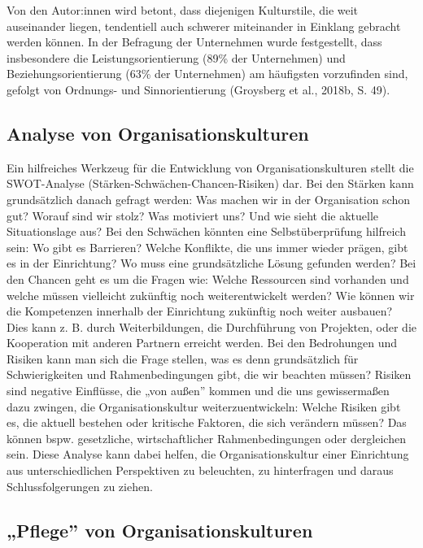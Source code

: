 \documentclass[
  letterpaper,
]{book}
\begin{document}
Von den Autor:innen wird betont, dass diejenigen Kulturstile, die weit
auseinander liegen, tendentiell auch schwerer miteinander in Einklang
gebracht werden können. In der Befragung der Unternehmen wurde
festgestellt, dass insbesondere die Leistungsorientierung (89\% der
Unternehmen) und Beziehungsorientierung (63\% der Unternehmen) am
häufigsten vorzufinden sind, gefolgt von Ordnungs- und Sinnorientierung
(Groysberg et al., 2018b, S. 49).

\subsection{Analyse von
Organisationskulturen}\label{analyse-von-organisationskulturen}

Ein hilfreiches Werkzeug für die Entwicklung von Organisationskulturen
stellt die SWOT-Analyse (Stärken-Schwächen-Chancen-Risiken) dar. Bei den
Stärken kann grundsätzlich danach gefragt werden: Was machen wir in der
Organisation schon gut? Worauf sind wir stolz? Was motiviert uns? Und
wie sieht die aktuelle Situationslage aus? Bei den Schwächen könnten
eine Selbstüberprüfung hilfreich sein: Wo gibt es Barrieren? Welche
Konflikte, die uns immer wieder prägen, gibt es in der Einrichtung? Wo
muss eine grundsätzliche Lösung gefunden werden? Bei den Chancen geht es
um die Fragen wie: Welche Ressourcen sind vorhanden und welche müssen
vielleicht zukünftig noch weiterentwickelt werden? Wie können wir die
Kompetenzen innerhalb der Einrichtung zukünftig noch weiter ausbauen?
Dies kann z. B. durch Weiterbildungen, die Durchführung von Projekten,
oder die Kooperation mit anderen Partnern erreicht werden. Bei den
Bedrohungen und Risiken kann man sich die Frage stellen, was es denn
grundsätzlich für Schwierigkeiten und Rahmenbedingungen gibt, die wir
beachten müssen? Risiken sind negative Einflüsse, die „von außen''
kommen und die uns gewissermaßen dazu zwingen, die Organisationskultur
weiterzuentwickeln: Welche Risiken gibt es, die aktuell bestehen oder
kritische Faktoren, die sich verändern müssen? Das können bspw.
gesetzliche, wirtschaftlicher Rahmenbedingungen oder dergleichen sein.
Diese Analyse kann dabei helfen, die Organisationskultur einer
Einrichtung aus unterschiedlichen Perspektiven zu beleuchten, zu
hinterfragen und daraus Schlussfolgerungen zu ziehen.

\subsection{„Pflege'' von
Organisationskulturen}\label{pflege-von-organisationskulturen}
\end{document}
